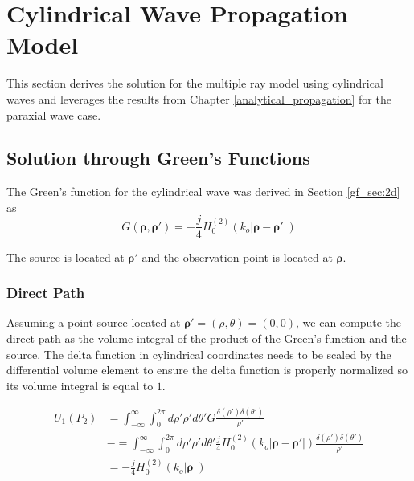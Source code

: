 \chapter{Cylindrical Wave Propagation Model}
\label{cylindrical_propagation}
This section derives the solution for the multiple ray model using cylindrical waves and leverages the results from Chapter \ref{analytical_propagation} for the paraxial wave case.

\section{Solution through Green's Functions}
The Green's function for the cylindrical wave was derived in Section \ref{gf_sec:2d} as
\begin{equation}
G\left(\boldsymbol{\rho},\boldsymbol{\rho}'\right) = -\frac{j}{4}H_0^{(2)}\left(k_o|\boldsymbol{\rho} - \boldsymbol{\rho}' | \right)
\label{cyl_eq:1}
\end{equation}
\renewcommand{\baselinestretch}{2} \small\normalsize

\noindent The source is located at $\boldsymbol{\rho}'$ and the observation point is located at $\boldsymbol{\rho}$. 

\subsection{Direct Path}
Assuming a point source located at $\boldsymbol{\rho}' = (\rho,\theta) = (0,0)$, we can compute the direct path as the volume integral of the product of the Green's function and the source. The delta function in cylindrical coordinates needs to be scaled by the differential volume element to ensure the delta function is properly normalized so its volume integral is equal to $1$.  

\begin{equation}
\begin{aligned}
U_1(P_2) & = \int_{-\infty}^{\infty}\int_0^{2\pi} d\rho' \rho' d\theta' G\frac{\delta(\rho')\delta(\theta')}{\rho'}\\
&-= \int_{-\infty}^{\infty}\int_0^{2\pi} d\rho' \rho' d\theta' \frac{j}{4}H_0^{(2)}\left(k_o|\boldsymbol{\rho} - \boldsymbol{\rho}' | \right)\frac{\delta(\rho')\delta(\theta')}{\rho'}\\
&=-\frac{j}{4}H_0^{(2)}\left(k_o|\boldsymbol{\rho}| \right)
\label{cyl_eq:2}
\end{aligned}
\end{equation}
\renewcommand{\baselinestretch}{2} \small\normalsize

